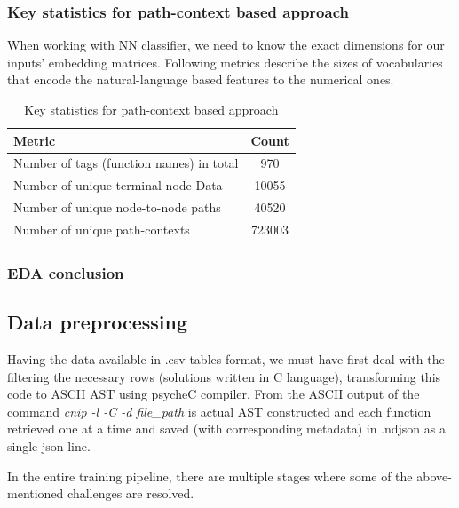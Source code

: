 \documentclass[10pt,english,a4paper]{report}
\begin{document}
\subsubsection{Key statistics for path-context based approach}
When working with NN classifier, we need to know the exact dimensions for our 
inputs' embedding matrices. Following metrics describe the sizes of vocabularies
that encode the natural-language based features to the numerical ones.


\begin{table}[h!]
    \centering
    \caption{Key statistics for path-context based approach}
    \label{tab:function_ast_summary}
    \begin{tabular}{|l|c|}
        \hline
        \textbf{Metric} & \textbf{Count} \\
        \hline
        Number of tags (function names) in total & 970 \\
        \hline
        Number of unique terminal node Data & 10055 \\
        \hline
        Number of unique node-to-node paths & 40520 \\
        \hline
        Number of unique path-contexts & 723003 \\
        \hline
    \end{tabular}
\end{table}

\subsubsection{EDA conclusion}

\subsection{Data preprocessing}
Having the data available in .csv tables format, we must have first deal with the filtering the necessary rows (solutions written in C language), transforming this code to ASCII AST using psycheC compiler. From the ASCII output of the command \textit{cnip -l -C -d file\_path} is actual
AST constructed and each function retrieved one at a time and saved (with corresponding metadata) in .ndjson as a single json line.

In the entire training pipeline, there are multiple stages where some of the above-mentioned challenges are resolved.
\end{document}
